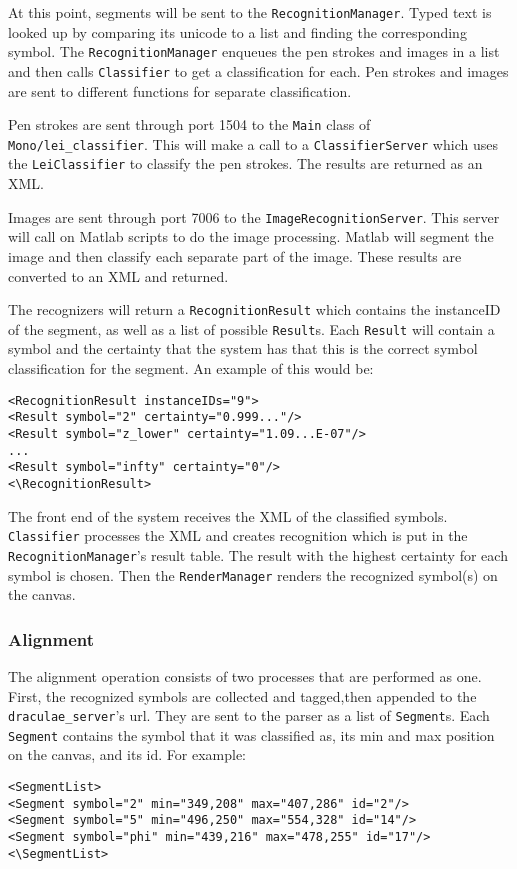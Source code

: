 \documentclass[letterpaper]{article}
\begin{document}
At this point, segments will be sent to the \verb+RecognitionManager+. Typed text is
looked up by comparing its unicode to a list and finding the corresponding symbol. The
\verb+RecognitionManager+ enqueues the pen strokes and images in a list and then calls
\verb+Classifier+ to get a classification for each. Pen strokes and images are sent to
different functions for separate classification.

Pen strokes are sent through port 1504 to the \verb+Main+ class of \verb+Mono/lei_classifier+.
This will make a call to a \verb+ClassifierServer+ which uses the \verb+LeiClassifier+ to
classify the pen strokes. The results are returned as an XML.

Images are sent through port 7006 to the \verb+ImageRecognitionServer+. This server will
call on Matlab scripts to do the image processing. Matlab will segment the image and then
classify each separate part of the image. These results are converted to an XML and returned.

The recognizers will return a \verb+RecognitionResult+ which contains the instanceID of the
segment, as well as a list of possible \verb+Result+s. Each \verb+Result+ will contain a
symbol and the certainty that the system has that this is the correct symbol classification
for the segment. An example of this would be:
\begin{verbatim}<RecognitionResult instanceIDs="9">
<Result symbol="2" certainty="0.999..."/>
<Result symbol="z_lower" certainty="1.09...E-07"/>
...
<Result symbol="infty" certainty="0"/>
<\RecognitionResult>\end{verbatim}

The front end of the system receives the XML of the classified symbols. \verb+Classifier+
processes the XML and creates recognition which is put in the \verb+RecognitionManager+'s
result table. The result with the highest certainty for each symbol is chosen. Then the
\verb+RenderManager+ renders the recognized symbol(s) on the canvas.

\subsubsection*{Alignment}
The alignment operation consists of two processes that are performed as one. 
First, the recognized symbols are collected and tagged,then appended to the \verb+draculae_server+'s url. 
They are sent to the parser as a list of \verb+Segment+s. Each \verb+Segment+ contains the symbol 
that it was classified as, its min and max position on the canvas, and its id. For example:
\begin{verbatim}<SegmentList>
<Segment symbol="2" min="349,208" max="407,286" id="2"/>
<Segment symbol="5" min="496,250" max="554,328" id="14"/>
<Segment symbol="phi" min="439,216" max="478,255" id="17"/>
<\SegmentList>\end{verbatim}
\end{document}
